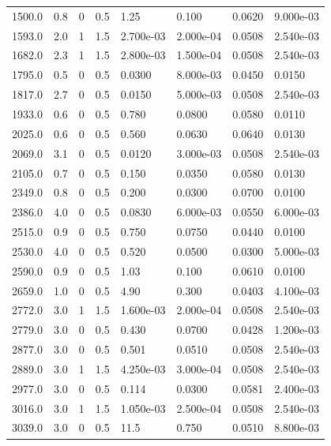 \documentclass[preview]{standalone}
\begin{document}
{{\begin{tabular}{L{1.2cm}C{1.2cm} C{0.3cm}C{0.5cm} C{1.4cm}C{1.4cm} C{1.4cm}C{1.4cm}}
  1500.0  &   0.8  & 0     & 0.5 &  1.25  & 0.100  & 0.0620 &  9.000e-03   \\ 
  1593.0  &   2.0  & 1     & 1.5 &  2.700e-03  & 2.000e-04  & 0.0508 &  2.540e-03   \\ 
  1682.0  &   2.3  & 1     & 1.5 &  2.800e-03  & 1.500e-04  & 0.0508 &  2.540e-03   \\ 
  1795.0  &   0.5  & 0     & 0.5 &  0.0300  & 8.000e-03  & 0.0450 &  0.0150   \\ 
  1817.0  &   2.7  & 0     & 0.5 &  0.0150  & 5.000e-03  & 0.0508 &  2.540e-03   \\ 
  1933.0  &   0.6  & 0     & 0.5 &  0.780  & 0.0800  & 0.0580 &  0.0110   \\ 
  2025.0  &   0.6  & 0     & 0.5 &  0.560  & 0.0630  & 0.0640 &  0.0130   \\ 
  2069.0  &   3.1  & 0     & 0.5 &  0.0120  & 3.000e-03  & 0.0508 &  2.540e-03   \\ 
  2105.0  &   0.7  & 0     & 0.5 &  0.150  & 0.0350  & 0.0580 &  0.0130   \\ 
  2349.0  &   0.8  & 0     & 0.5 &  0.200  & 0.0300  & 0.0700 &  0.0100   \\ 
  2386.0  &   4.0  & 0     & 0.5 &  0.0830  & 6.000e-03  & 0.0550 &  6.000e-03   \\ 
  2515.0  &   0.9  & 0     & 0.5 &  0.750  & 0.0750  & 0.0440 &  0.0100   \\ 
  2530.0  &   4.0  & 0     & 0.5 &  0.520  & 0.0500  & 0.0300 &  5.000e-03   \\ 
  2590.0  &   0.9  & 0     & 0.5 &  1.03  & 0.100  & 0.0610 &  0.0100   \\ 
  2659.0  &   1.0  & 0     & 0.5 &  4.90  & 0.300  & 0.0403 &  4.100e-03   \\ 
  2772.0  &   3.0  & 1     & 1.5 &  1.600e-03  & 2.000e-04  & 0.0508 &  2.540e-03   \\ 
  2779.0  &   3.0  & 0     & 0.5 &  0.430  & 0.0700  & 0.0428 &  1.200e-03   \\ 
  2877.0  &   3.0  & 0     & 0.5 &  0.501  & 0.0510  & 0.0508 &  2.540e-03   \\ 
  2889.0  &   3.0  & 1     & 1.5 &  4.250e-03  & 3.000e-04  & 0.0508 &  2.540e-03   \\ 
  2977.0  &   3.0  & 0     & 0.5 &  0.114  & 0.0300  & 0.0581 &  2.400e-03   \\ 
  3016.0  &   3.0  & 1     & 1.5 &  1.050e-03  & 2.500e-04  & 0.0508 &  2.540e-03   \\ 
  3039.0  &   3.0  & 0     & 0.5 &  11.5  & 0.750  & 0.0510 &  8.800e-03   \\ 

\end{tabular}}}
\end{document}
